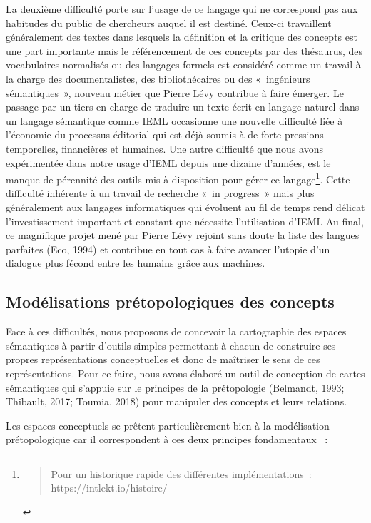 \documentclass[
  a4paper,
  DIV=11,
  numbers=noendperiod]{scrreprt}
\begin{document}
La deuxième difficulté porte sur l'usage de ce langage qui ne correspond
pas aux habitudes du public de chercheurs auquel il est destiné. Ceux-ci
travaillent généralement des textes dans lesquels la définition et la
critique des concepts est une part importante mais le référencement de
ces concepts par des thésaurus, des vocabulaires normalisés ou des
langages formels est considéré comme un travail à la charge des
documentalistes, des bibliothécaires ou des «~ingénieurs sémantiques~»,
nouveau métier que Pierre Lévy contribue à faire émerger. Le passage par
un tiers en charge de traduire un texte écrit en langage naturel dans un
langage sémantique comme IEML occasionne une nouvelle difficulté liée à
l'économie du processus éditorial qui est déjà soumis à de forte
pressions temporelles, financières et humaines. Une autre difficulté que
nous avons expérimentée dans notre usage d'IEML depuis une dizaine
d'années, est le manque de pérennité des outils mis à disposition pour
gérer ce langage\footnote{\begin{quote}
  Pour un historique rapide des différentes implémentations~:
  https://intlekt.io/histoire/
  \end{quote}}. Cette difficulté inhérente à un travail de recherche
«~in progress~» mais plus généralement aux langages informatiques qui
évoluent au fil de temps rend délicat l'investissement important et
constant que nécessite l'utilisation d'IEML Au final, ce magnifique
projet mené par Pierre Lévy rejoint sans doute la liste des langues
parfaites (Eco, 1994) et contribue en tout cas à faire avancer l'utopie
d'un dialogue plus fécond entre les humains grâce aux machines.

\subsection{Modélisations prétopologiques des
concepts}\label{sec-modelisationsPretopologique}

Face à ces difficultés, nous proposons de concevoir la cartographie des
espaces sémantiques à partir d'outils simples permettant à chacun de
construire ses propres représentations conceptuelles et donc de
maîtriser le sens de ces représentations. Pour ce faire, nous avons
élaboré un outil de conception de cartes sémantiques qui s'appuie sur le
principes de la prétopologie (Belmandt, 1993; Thibault, 2017; Toumia,
2018) pour manipuler des concepts et leurs relations.

Les espaces conceptuels se prêtent particulièrement bien à la
modélisation prétopologique car il correspondent à ces deux principes
fondamentaux ~:
\end{document}
